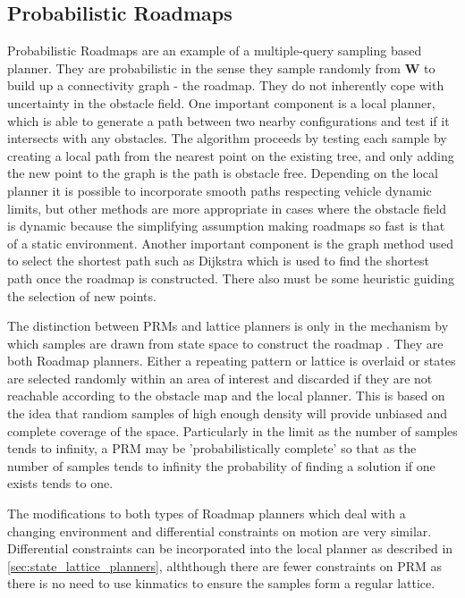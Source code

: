 \subsection{Probabilistic Roadmaps}
Probabilistic Roadmaps are an example of a multiple-query sampling based planner. They are probabilistic in the sense they sample randomly from $\mathbf{W}$ to build up a connectivity graph - the roadmap. They do not inherently cope with uncertainty in the obstacle field.
One important component is a local planner, which is able to generate a path between two nearby configurations and test if it intersects with any obstacles. The algorithm proceeds by testing each sample by creating a local path from the nearest point on the existing tree, and only adding the new point to the graph is the path is obstacle free. Depending on the local planner it is possible to incorporate smooth paths respecting vehicle dynamic limits, but other methods are more appropriate in cases where the obstacle field is dynamic because the simplifying assumption making roadmaps so fast is that of a static environment. 
Another important component is the graph method used to select the shortest path such as Dijkstra which is used to find the shortest path once the roadmap is constructed. There also must be some heuristic guiding the selection of new points.

The distinction between PRMs and lattice planners is only in the mechanism by which samples are drawn from state space to construct the roadmap \cite{SicilianoKhatib2016}. They are both Roadmap planners. Either a repeating pattern or lattice is overlaid or states are selected randomly within an area of interest and discarded if they are not reachable according to the obstacle map and the local planner. This is based on the idea that randiom samples of high enough density will provide unbiased and complete coverage of the space. Particularly in the limit as the number of samples tends to infinity, a PRM may be 'probabilistically complete' so that as the number of samples tends to infinity the probability of finding a solution if one exists tends to one.

The modifications to both types of Roadmap planners which deal with a changing environment and differential constraints on motion are very similar. Differential constraints can be incorporated into the local planner as described in \ref{sec:state_lattice_planners}, alththough there are fewer constraints on PRM as there is no need to use kinmatics to ensure the samples form a regular lattice. 

